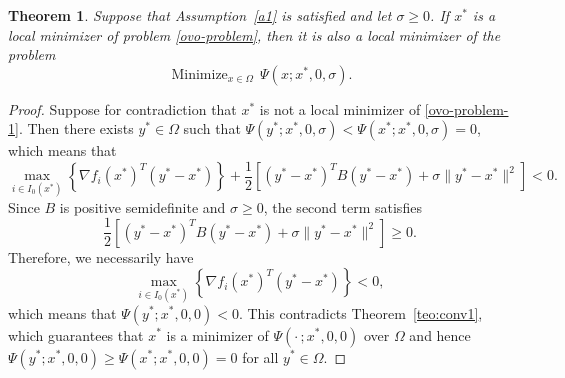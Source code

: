 \documentclass[11pt]{article}
\newcommand{\minimize}{\mathop{\text{Minimize}}}
\newtheorem{theorem}{Theorem}[section]
\begin{document}


\begin{theorem} \label{teo:conv2}
Suppose that Assumption~\ref{a1} is satisfied and let $\sigma \geq 0$. 
If $x^*$ is a local minimizer of problem \eqref{ovo-problem}, then it 
is also a local minimizer of the problem
\begin{equation} \label{ovo-problem-1}
    \minimize_{x \in \Omega}\, \Psi(x; x^*, 0, \sigma).
\end{equation}
\end{theorem}

\begin{proof}
Suppose for contradiction that $x^*$ is not a local minimizer of 
\eqref{ovo-problem-1}. Then there exists $y^* \in \Omega$ such that 
$\Psi(y^*; x^*, 0, \sigma) < \Psi(x^*; x^*, 0, \sigma) = 0$, which 
means that
\begin{equation*}
    \max_{i \in I_0(x^*)} \left\{ \nabla f_i(x^*)^T(y^* - x^*) \right\} 
    + \frac{1}{2}\left[(y^* - x^*)^T B (y^* - x^*) 
    + \sigma \|y^* - x^*\|^2\right] < 0.
\end{equation*}
Since $B$ is positive semidefinite and $\sigma \geq 0$, the second 
term satisfies
\begin{equation*}
    \frac{1}{2}\left[(y^* - x^*)^T B (y^* - x^*) 
    + \sigma \|y^* - x^*\|^2\right] \geq 0.
\end{equation*}
Therefore, we necessarily have
\begin{equation*}
    \max_{i \in I_0(x^*)} \left\{ \nabla f_i(x^*)^T(y^* - x^*) \right\} 
    < 0,
\end{equation*}
which means that $\Psi(y^*; x^*, 0, 0) < 0$. This contradicts 
Theorem~\ref{teo:conv1}, which guarantees that $x^*$ is a minimizer 
of $\Psi(\cdot\,; x^*, 0, 0)$ over $\Omega$ and hence 
$\Psi(y^*; x^*, 0, 0) \geq \Psi(x^*; x^*, 0, 0) = 0$ for all 
$y^* \in \Omega$.
\end{proof}
\end{document}
